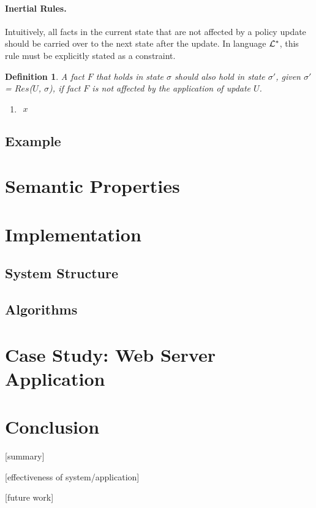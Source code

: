\documentclass[10pt, twocolumn]{article}
\newtheorem{definition}{Definition}
\begin{document}
        \paragraph{Inertial Rules.}

          Intuitively, all facts in the current state that are not affected by
          a policy update should be carried over to the next state after the
          update. In language ${\cal L}^{*}$, this rule must be explicitly
          stated as a constraint.

          \begin{definition}
            A fact $F$ that holds in state $\sigma$ should also hold in state
            $\sigma'$, given $\sigma'$ = $Res$($U$, $\sigma$), if fact $F$ is
            not affected by the application of update $U$.

            \begin{enumerate}
              \item
                \begin{math} 
                  \begin{aligned}
                    x 
                  \end{aligned}
                \end{math}
            \end{enumerate}
          \end{definition}

    \subsection{Example}

  \section{Semantic Properties}

  \section{Implementation}

    \subsection{System Structure}

    \subsection{Algorithms}

  \section{Case Study: Web Server Application}

  \section{Conclusion}

    [summary]

    [effectiveness of system/application]

    [future work]
\end{document}
